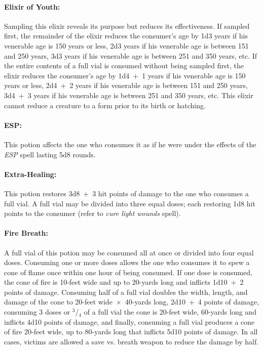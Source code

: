 \begin{multicols}{2}
\paragraph{Elixir of Youth:} Sampling this elixir reveals its purpose but reduces its effectiveness.  If sampled first, the remainder of the elixir reduces the consumer's age by 1d3 years if his venerable age is 150 years or less, 2d3 years if his venerable age is between 151 and 250 years, 3d3 years if his venerable age is between 251 and 350 years, etc.  If the entire contents of a full vial is consumed without being sampled first, the elixir reduces the consumer's age by 1d4~+~1 years if his venerable age is 150 years or less, 2d4~+~2 years if his venerable age is between 151 and 250 years, 3d4~+~3 years if his venerable age is between 251 and 350 years, etc.  This elixir cannot reduce a creature to a form prior to its birth or hatching.  

\paragraph{ESP:} This potion affects the one who consumes it as if he were under the effects of the \textit{ESP} spell lasting 5d8 rounds.

\paragraph{Extra-Healing:} This potion restores 3d8~+~3 hit points of damage to the one who consumes a full vial.  A full vial may be divided into three equal doses; each restoring 1d8 hit points to the consumer (refer to \textit{cure light wounds} spell).

\paragraph{Fire Breath:} A full vial of this potion may be consumed all at once or divided into four equal doses.  Consuming one or more doses allows the one who consumes it to spew a cone of flame once within one hour of being consumed.  If one dose is consumed, the cone of fire is 10-feet wide and up to 20-yards long and inflicts 1d10~+~2 points of damage.  Consuming half of a full vial doubles the width, length, and damage of the cone to 20-feet wide~$\times$~40-yards long, 2d10~+~4 points of damage, consuming 3 doses or $^3$/$_4$ of a full vial the cone is 20-feet wide, 60-yards long and inflicts 4d10 points of damage, and finally, consuming a full vial produces a cone of fire 20-feet wide, up to 80-yards long that inflicts 5d10 points of damage.  In all cases, victims are allowed a save vs. breath weapon to reduce the damage by half.


\end{multicols}
